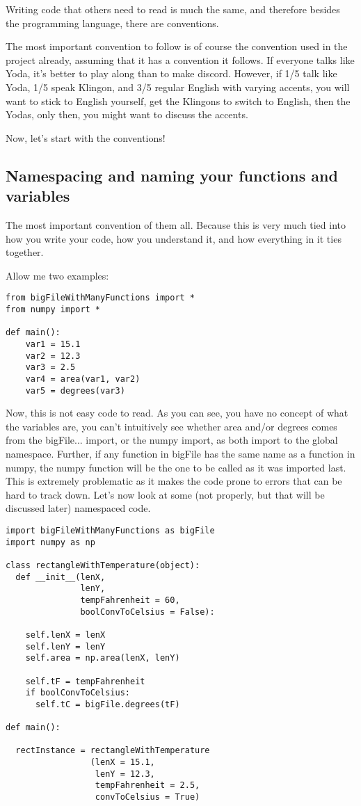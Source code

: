 \documentclass[10pt,a4paper]{article}
\begin{document}
Writing code that others need to read is much the same, and therefore besides the programming language, there are conventions. 

The most important convention to follow is of course the convention used in the project already, assuming that it has a convention it follows. If everyone talks like Yoda, it's better to play along than to make discord. However, if 1/5 talk like Yoda, 1/5 speak Klingon, and 3/5 regular English with varying accents, you will want to stick to English yourself, get the Klingons to switch to English, then the Yodas, only then, you might want to discuss the accents.

Now, let's start with the conventions!
\subsection{Namespacing and naming your functions and variables}
The most important convention of them all. Because this is very much tied into how you write your code, how you understand it, and how everything in it ties together.

Allow me two examples:
\begin{lstlisting}
from bigFileWithManyFunctions import *
from numpy import *

def main():
	var1 = 15.1
	var2 = 12.3
	var3 = 2.5
	var4 = area(var1, var2)
	var5 = degrees(var3)

\end{lstlisting}

Now, this is not easy code to read. As you can see, you have no concept of what the variables are, you can't intuitively see whether area and/or degrees comes from the bigFile... import, or the numpy import, as both import to the global namespace. Further, if any function in bigFile has the same name as a function in numpy, the numpy function will be the one to be called as it was imported last. This is extremely problematic as it makes the code prone to errors that can be hard to track down. Let's now look at some (not properly, but that will be discussed later) namespaced code.

\begin{lstlisting}
import bigFileWithManyFunctions as bigFile
import numpy as np

class rectangleWithTemperature(object):
  def __init__(lenX, 
               lenY, 
               tempFahrenheit = 60, 
               boolConvToCelsius = False):
               
    self.lenX = lenX
    self.lenY = lenY
    self.area = np.area(lenX, lenY)
		
    self.tF = tempFahrenheit
    if boolConvToCelsius:
      self.tC = bigFile.degrees(tF)

def main():

  rectInstance = rectangleWithTemperature
                 (lenX = 15.1, 
                  lenY = 12.3, 
                  tempFahrenheit = 2.5, 
                  convToCelsius = True)
	
\end{lstlisting}
\end{document}
